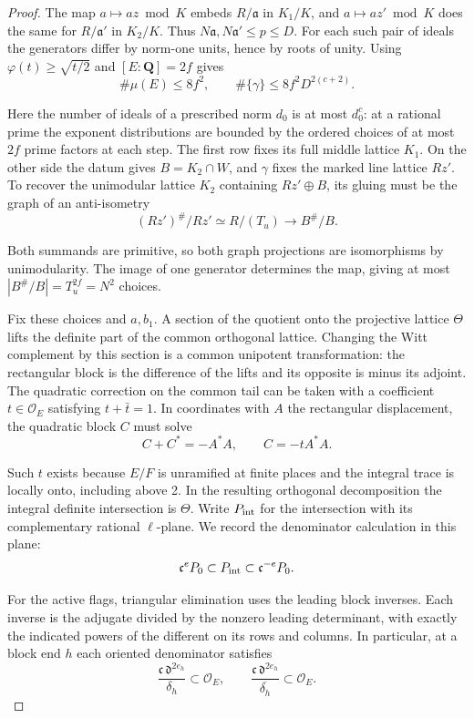 \begin{proof}
The map \(a\mapsto az\bmod K\) embeds \(R/\mathfrak a\) in
\(K_1/K\), and \(a\mapsto az'\bmod K\) does the same for
\(R/\mathfrak a'\) in \(K_2/K\). Thus
\(N\mathfrak a,N\mathfrak a'\le p\le D\).
For each such pair of ideals the
generators differ by norm-one units, hence by roots of unity.
Using \(\varphi(t)\ge\sqrt{t/2}\) and \([E:\mathbf Q]=2f\) gives
\[
 \#\mu(E)\le8f^2,\qquad
 \#\{\gamma\}\le 8f^2D^{2(c+2)} .
\]

Here the number of ideals of a prescribed norm \(d_0\) is at
most \(d_0^c\): at a rational prime the exponent distributions
are bounded by the ordered choices of at most \(2f\) prime factors
at each step. The first row fixes its full middle lattice \(K_1\). On the other
side the datum gives \(B=K_2\cap W\), and \(\gamma\) fixes the
marked line lattice \(Rz'\). To recover the unimodular lattice
\(K_2\) containing \(Rz'\oplus B\), its gluing must be the graph
of an anti-isometry
\[
             (Rz')^\#/Rz'\simeq R/(T_u)\longrightarrow B^\#/B .
\]

Both summands are primitive, so both graph projections are
isomorphisms by unimodularity. The image of one generator determines
the map, giving at most \(|B^\#/B|=T_u^{2f}=N^2\) choices.

Fix these choices and \(a,b_1\). A section of the quotient onto
the projective lattice \(\Theta\) lifts the definite part of the
common orthogonal lattice. Changing the Witt complement by this
section is a common unipotent transformation: the rectangular block
is the difference of the lifts and its opposite is minus its adjoint.
The quadratic correction on the common tail can be taken with
a coefficient \(t\in\mathcal O_E\) satisfying \(t+\bar t=1\).
In coordinates with \(A\) the rectangular displacement, the
quadratic block \(C\) must solve
\[
 C+C^*=-A^* A,\qquad C=-t A^* A .
\]

Such \(t\) exists because \(E/F\) is unramified at finite places
and the integral trace is locally onto, including above 2.
In the resulting orthogonal decomposition the integral definite
intersection is \(\Theta\). Write \(P_{\rm int}\) for the
intersection with its complementary rational \(\ell\)-plane.
We record the denominator calculation in this plane:
\begin{equation}\label{eq:zero-gram-lattice-sandwich}
             \mathfrak c^{e}P_0\subset P_{\rm int}
                           \subset\mathfrak c^{-e}P_0 .
\end{equation}

For the active flags, triangular elimination uses the leading
block inverses. Each inverse is the adjugate divided by the
nonzero leading determinant, with exactly the indicated powers
of the different on its rows and columns. In particular, at a
block end \(h\) each oriented denominator satisfies
\[
 \frac{\mathfrak c\,\mathfrak d^{2e_h}}{\delta_h}
       \subset\mathcal O_E,\qquad
 \frac{\mathfrak c\,\mathfrak d^{2e_h}}{\overline{\delta_h}}
       \subset\mathcal O_E .
\]


\end{proof}
